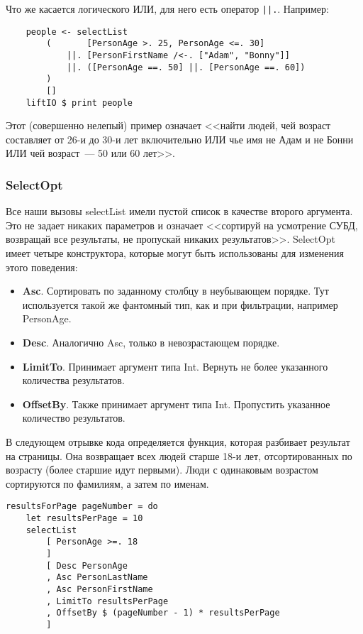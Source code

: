 Что же касается логического ИЛИ, для него есть оператор \lstinline'||.'. Например:

\begin{lstlisting}
    people <- selectList
        (       [PersonAge >. 25, PersonAge <=. 30]
            ||. [PersonFirstName /<-. ["Adam", "Bonny"]]
            ||. ([PersonAge ==. 50] ||. [PersonAge ==. 60])
        )
        []
    liftIO $ print people
\end{lstlisting}%

Этот (совершенно нелепый) пример означает <<найти людей, чей возраст составляет от 26-и до 30-и лет включительно ИЛИ чье имя не Адам и не Бонни ИЛИ чей возраст~--- 50 или 60 лет>>.

\subsubsection{SelectOpt}

Все наши вызовы selectList имели пустой список в качестве второго аргумента. Это не задает никаких параметров и означает <<сортируй на усмотрение СУБД, возвращай все результаты, не пропускай никаких результатов>>. SelectOpt имеет четыре конструктора, которые могут быть использованы для изменения этого поведения:

\begin{itemize}
\item {\bf Asc}. Сортировать по заданному столбцу в неубывающем порядке. Тут используется такой же фантомный тип, как и при фильтрации, например PersonAge.
\item {\bf Desc}. Аналогично Asc, только в невозрастающем порядке.
\item {\bf LimitTo}. Принимает аргумент типа Int. Вернуть не более указанного количества результатов.
\item {\bf OffsetBy}. Также принимает аргумент типа Int. Пропустить указанное количество результатов.
\end{itemize}

В следующем отрывке кода определяется функция, которая разбивает результат на страницы. Она возвращает всех людей старше 18-и лет, отсортированных по возрасту (более старшие идут первыми). Люди с одинаковым возрастом сортируются по фамилиям, а затем по именам.

\begin{lstlisting}
resultsForPage pageNumber = do
    let resultsPerPage = 10
    selectList
        [ PersonAge >=. 18
        ]
        [ Desc PersonAge
        , Asc PersonLastName
        , Asc PersonFirstName
        , LimitTo resultsPerPage
        , OffsetBy $ (pageNumber - 1) * resultsPerPage
        ]
\end{lstlisting}%


